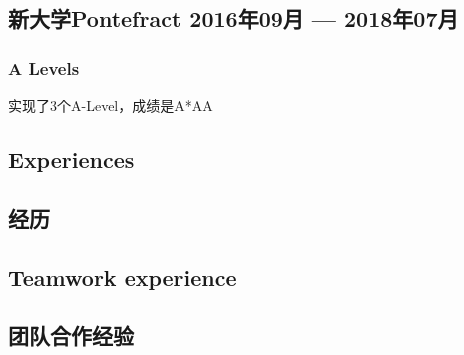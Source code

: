 \begin{xcn}
        \subsection{新大学Pontefract
            \hfill 2016年09月 --- 2018年07月}
            \subsubsection{A Levels}
            实现了3个A-Level，成绩是A*AA
\end{xcn}
\begin{xen}
\end{xen}
\begin{xcn}
\end{xcn}
\begin{xen}
\section{Experiences}
\end{xen}
\begin{xcn}
\section{经历}
\end{xcn}
\begin{xen}
    \subsection{Teamwork experience}
\end{xen}
\begin{xcn}
    \subsection{团队合作经验}
\end{xcn}
